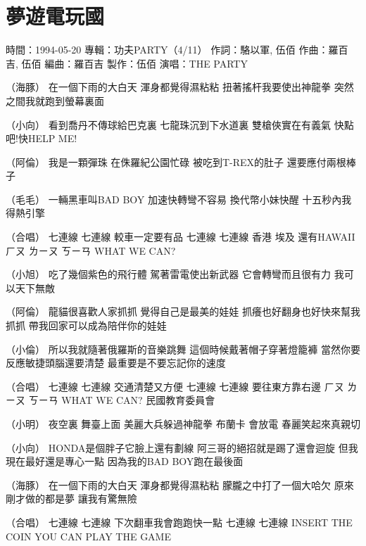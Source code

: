 \documentclass[UTF8,a4paper,oneside,twocolumn,12pt]{ctexbook}
\newcommand{\infopair}[2]{\textbullet #1：#2}
\newcommand{\zc}[1][伍佰]{\infopair{作詞}{#1}}
\newcommand{\zq}[1][伍佰]{\infopair{作曲}{#1}}
\newcommand{\bq}[1][伍佰]{\infopair{編曲}{#1}}
\newcommand{\zj}[1]{\infopair{專輯}{#1}}
\newcommand{\zz}[1]{\infopair{製作}{#1}}
\newcommand{\sj}[1]{\infopair{時間}{#1}}
\newenvironment{info}{\begin{flushleft}\kaishu
	}
	{\end{flushleft}\normalsize\yahei\par}
\newenvironment{lyric}{
	}
{}
\begin{document}
\section{夢遊電玩國}
\begin{info}
	\sj{1994-05-20}
	\zj{功夫PARTY（4/11）}
	\zc[駱以軍, 伍佰]
	\zq[羅百吉, 伍佰]
	\bq[羅百吉]
	\zz{伍佰}
	\infopair{演唱}{THE PARTY}
\end{info}
\begin{lyric}
	（海豚）
	在一個下雨的大白天 渾身都覺得濕粘粘
	扭著搖杆我要使出神龍拳
	突然之間我就跑到螢幕裏面

	（小向）
	看到喬丹不傳球給巴克裏 七龍珠沉到下水道裏
	雙槍俠實在有義氣 快點吧!快HELP ME!

	（阿倫）
	我是一顆彈珠 在侏羅紀公園忙碌
	被吃到T-REX的肚子 還要應付兩根棒子

	（毛毛）
	一輛黑車叫BAD BOY 加速快轉彎不容易
	換代幣小妹快醒 十五秒內我得熱引擎

	（合唱）
	七連線 七連線 較車一定要有品
	七連線 七連線 香港 埃及 還有HAWAII
	ㄏㄡ ㄌㄧㄡ ㄎㄧㄢ WHAT WE CAN?

	（小旭）
	吃了幾個紫色的飛行體 駕著雷電使出新武器
	它會轉彎而且很有力 我可以天下無敵

	（阿倫）
	龍貓很喜歡人家抓抓 覺得自己是最美的娃娃
	抓癢也好翻身也好快來幫我抓抓
	帶我回家可以成為陪伴你的娃娃

	（小倫）
	所以我就隨著俄羅斯的音樂跳舞
	這個時候戴著帽子穿著燈籠褲
	當然你要反應敏捷頭腦還要清楚
	最重要是不要忘記你的速度

	（合唱）
	七連線 七連線 交通清楚又方便
	七連線 七連線 要往東方靠右邊
	ㄏㄡ ㄌㄧㄡ ㄎㄧㄢ WHAT WE CAN?
	民國教育委員會

	（小明）
	夜空裏 舞臺上面 美麗大兵躲過神龍拳
	布蘭卡 會放電 春麗笑起來真親切

	（小向）
	HONDA是個胖子它臉上還有劃線
	阿三哥的絕招就是踢了還會迴旋
	但我現在最好還是專心一點 因為我的BAD BOY跑在最後面

	（海豚）
	在一個下雨的大白天 渾身都覺得濕粘粘
	朦朧之中打了一個大哈欠 原來剛才做的都是夢
	讓我有驚無險

	（合唱）
	七連線 七連線 下次翻車我會跑跑快一點
	七連線 七連線
	INSERT THE COIN YOU CAN PLAY THE GAME
\end{lyric}
\end{document}

